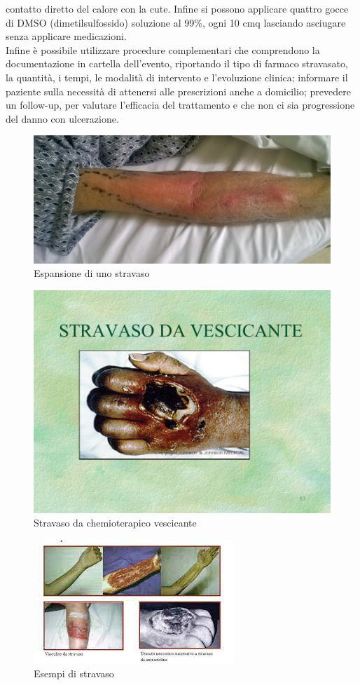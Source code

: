 contatto diretto del calore con la cute. Infine si possono applicare quattro gocce di DMSO (dimetilsulfossido) 
soluzione al 99\%, ogni 10 cmq lasciando asciugare senza applicare medicazioni\cite{STRAVASOTOSCANA}.\\ 
Infine è possibile utilizzare procedure complementari che comprendono la documentazione in cartella dell’evento, 
riportando il tipo di farmaco stravasato, la quantità, i tempi, le modalità di intervento e l’evoluzione clinica; 
informare il paziente sulla necessità di attenersi alle prescrizioni anche a domicilio; prevedere un follow-up, 
per valutare l'efficacia del trattamento e che non ci sia progressione del danno con ulcerazione\cite{STRAVASOTOSCANA}.\\

\begin{figure}[H]
    \begin{center}
    \includegraphics[width=0.6\columnwidth]{img/stravaso.jpeg}
    \end{center}
    \caption{Espansione di uno stravaso
    \cite{img54}}
    \label{fig:FIGURE_4.18}
\end{figure}

\begin{figure}[H]
    \begin{center}
    \includegraphics[width=0.5\columnwidth]{img/STRAVASOVESCICANTE.jpeg}
    \end{center}
    \caption{Stravaso da chemioterapico vescicante
    \cite{img55}}
    \label{fig:FIGURE_4.19}
\end{figure}

\begin{figure}[H]
    \begin{center}
    \includegraphics[width=0.5\columnwidth]{img/stravaso1.jpeg}
    \end{center}
    \caption{Esempi di stravaso
    \cite{img56}}
    \label{fig:FIGURE_4.20}
\end{figure}

